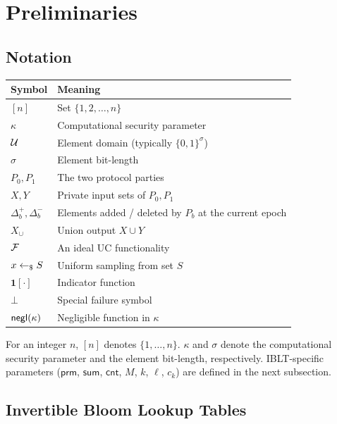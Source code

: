 \section{Preliminaries}
\label{sec:overview}

\subsection{Notation}

\begin{center}
\footnotesize
\begin{tabular}{|l|l|}
\hline
\textbf{Symbol} & \textbf{Meaning} \\
\hline
$[n]$        & Set $\{1, 2, \dots, n\}$ \\
$\kappa$      & Computational security parameter \\
$\mathcal{U}$          & Element domain (typically $\{0,1\}^\sigma$) \\
$\sigma$      & Element bit-length \\
$P_0, P_1$   & The two protocol parties \\
$X, Y$       & Private input sets of $P_0, P_1$ \\
$\Delta^+_b, \Delta^-_b$ & Elements added / deleted by $P_b$ at the current epoch \\
$X_\cup$     & Union output $X \cup Y$ \\
$\mathcal{F}$        & An ideal UC functionality \\
$x \leftarrow_{\$} S$ & Uniform sampling from set $S$ \\
$\mathbf{1}[\cdot]$ & Indicator function \\
$\bot$        & Special failure symbol \\
$\mathsf{negl}(\kappa)$ & Negligible function in $\kappa$ \\
\hline
\end{tabular}
\end{center}

\noindent For an integer $n$, $[n]$ denotes $\{1, \dots, n\}$. $\kappa$ and $\sigma$
denote the computational security parameter and the element bit-length,
respectively. IBLT-specific parameters ($\mathsf{prm}$, $\mathsf{sum}$,
$\mathsf{cnt}$, $M$, $k$, $\ell$, $c_k$) are defined in the next subsection.


\subsection{Invertible Bloom Lookup Tables}

